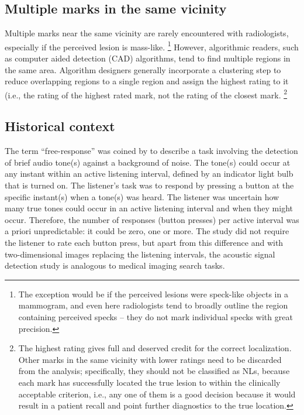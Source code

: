 \documentclass[
]{book}
\begin{document}
\hypertarget{multiple-marks-in-the-same-vicinity}{%
\subsection{Multiple marks in the same vicinity}\label{multiple-marks-in-the-same-vicinity}}

Multiple marks near the same vicinity are rarely encountered with radiologists, especially if the perceived lesion is mass-like. \footnote{The exception would be if the perceived lesions were speck-like objects in a mammogram, and even here radiologists tend to broadly outline the region containing perceived specks -- they do not mark individual specks with great precision.} However, algorithmic readers, such as computer aided detection (CAD) algorithms, tend to find multiple regions in the same area. Algorithm designers generally incorporate a clustering step to reduce overlapping regions to a single region and assign the highest rating to it (i.e., the rating of the highest rated mark, not the rating of the closest mark. \footnote{The highest rating gives full and deserved credit for the correct localization. Other marks in the same vicinity with lower ratings need to be discarded from the analysis; specifically, they should not be classified as NLs, because each mark has successfully located the true lesion to within the clinically acceptable criterion, i.e., any one of them is a good decision because it would result in a patient recall and point further diagnostics to the true location.}

\hypertarget{historical-context}{%
\subsection{Historical context}\label{historical-context}}

The term ``free-response'' was coined by \citep{egan1961operating} to describe a task involving the detection of brief audio tone(s) against a background of noise. The tone(s) could occur at any instant within an active listening interval, defined by an indicator light bulb that is turned on. The listener's task was to respond by pressing a button at the specific instant(s) when a tone(s) was heard. The listener was uncertain how many true tones could occur in an active listening interval and when they might occur. Therefore, the number of responses (button presses) per active interval was a priori unpredictable: it could be zero, one or more. The study did not require the listener to rate each button press, but apart from this difference and with two-dimensional images replacing the listening intervals, the acoustic signal detection study is analogous to medical imaging search tasks.
\end{document}
